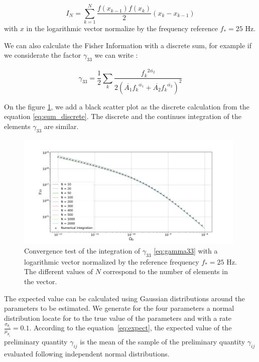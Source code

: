\documentclass[a4paper,12pt]{article}
\begin{document}
\begin{equation}\label{eq:trapeze}
    I_N = \sum_{k=1}^{N} \frac{f(x_{k-1})  f(x_{k})}{2} (x_k-x_{k-1})
\end{equation}
with $x$ in the logarithmic vector normalize by the frequency reference $f_* = 25 \text{ Hz}$.

We can also calculate the Fisher Information with a discrete sum, for example if we considerate the
factor $\gamma_{33}$ we can write :

\begin{equation}\label{eq:sum_discrete}
    \gamma_{33} = \frac{1}{2} \sum_k \frac{ {f_k}^{2 \overline{ \alpha_2}}}{2(\overline{A_1}{f_k}^{\overline{ \alpha_1}} +\overline{A_2}{f_k}^{\overline{ \alpha_2}})^2}
\end{equation}   

On the figure \ref{fig:gamma33}, we add a black scatter plot as the discrete calculation from the equation \ref{eq:sum_discrete}. The discrete and the continues integration of the elements $\gamma_{33}$ are similar.    

\begin{figure}[H]
    \centering
    \includegraphics[height= 5.5cm]{Fisher.png}
    \caption{Convergence test of the integration of $\gamma_{33}$ \ref{eq:gamma33} with a logarithmic vector normalized by the reference frequency $f_* = 25 \text{ Hz}$. The different values of $N$ correspond to the number of elements in the vector.}
    \label{fig:gamma33}
\end{figure}

The expected value can be calculated using Gaussian distributions around the parameters to be estimated. We generate for the four parameters a normal distribution locate for to the true value of the parameters and with a rate $\frac{\sigma_{\theta_i}}{\mu_{\theta_i}} = 0.1$. According to the equation~\ref{eq:expect}, the expected value of the preliminary quantity $\gamma_{ij}$ is the mean of the sample of the preliminary quantity $\gamma_{ij}$ evaluated following independent normal distributions. 
\end{document}
